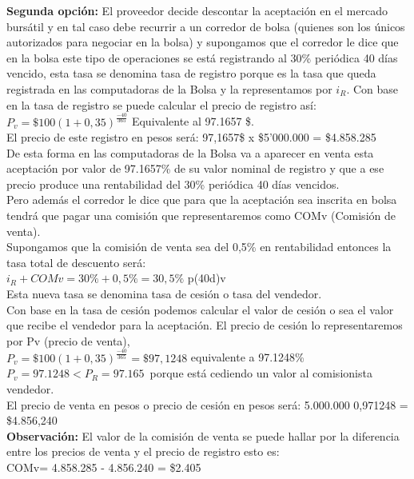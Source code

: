 	\textbf{Segunda opción:} El proveedor decide descontar la aceptación en el mercado bursátil y en tal caso debe recurrir a un corredor de bolsa (quienes son los únicos autorizados para negociar en la bolsa) y supongamos que el corredor le dice que en la bolsa este tipo de operaciones se está registrando al 30\% periódica 40 días vencido, esta tasa se denomina tasa de registro porque es la tasa que queda registrada en las computadoras de la Bolsa y la representamos por $i_{R}$. Con base en la tasa de registro se puede calcular el precio de registro así: \\
	$P_{v}= \$100  (1 + 0,35)^{\frac{-40}{365}}$ Equivalente al 97.1657 \$.\\
	El precio de este registro en pesos será: 97,1657\$ x \$5'000.000 = \$4.858.285\\
	De esta forma en las computadoras de la Bolsa va a aparecer en venta esta aceptación por valor de 97.1657\% de su valor nominal de registro y que a ese precio produce una rentabilidad del 30\% periódica 40 días vencidos.\\
	Pero además el corredor le dice que para que la aceptación sea inscrita en bolsa tendrá que pagar una comisión que representaremos como COMv (Comisión de venta).\\
	Supongamos que la comisión de venta sea del 0,5\% en rentabilidad entonces la tasa total de descuento será: \\
	$i_{R} + COMv = 30\% + 0,5\% = 30,5\%$ p(40d)v\\
	Esta nueva tasa se denomina tasa de cesión o tasa del vendedor.\\
	Con base en la tasa de cesión podemos calcular el valor de cesión o sea el valor que recibe el vendedor para la aceptación. El precio de cesión lo representaremos por Pv (precio de venta), \\
	$P_{v}  = \$100(1+0,35)^\frac{-40}{365} = \$97,1248 $ equivalente a 97.1248\%\\
	$P_{v} = 97.1248 < P_{R} = 97.165$\ porque está cediendo un valor al comisionista vendedor.\\
	El precio de venta en pesos o precio de cesión en pesos será: 5.000.000  0,971248 = \$4.856,240\\
	
	\textbf{Observación:} El valor de la comisión de venta se puede hallar por la diferencia entre los precios de venta y el precio de registro esto es: \\
	COMv= 4.858.285 - 4.856.240 = \$2.405\\
	
